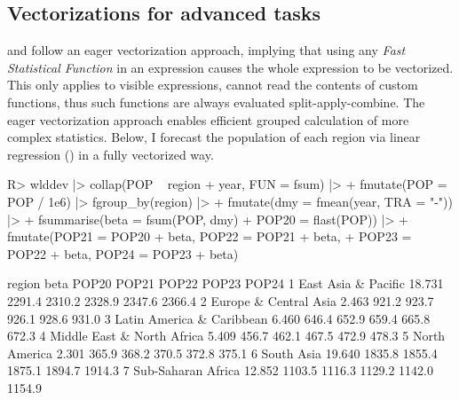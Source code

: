 \documentclass[nojss]{jss} %
\newcommand{\fct}[1]{\code{#1()}}
\begin{document}
\subsection{Vectorizations for advanced tasks} \label{ssec:vfat}
%
\fct{fsummarise} and \fct{fmutate} follow an eager vectorization approach, implying that using any \emph{Fast Statistical Function} in an expression causes the whole expression to be vectorized. This only applies to visible expressions,  cannot read the contents of custom functions, thus such functions are always evaluated split-apply-combine. The eager vectorization approach enables efficient grouped calculation of more complex statistics. Below, I forecast the population of each region via linear regression () in a fully vectorized way.
%
\begin{Schunk}
\begin{Sinput}
R> wlddev |> collap(POP ~ region + year, FUN = fsum) |>
+    fmutate(POP = POP / 1e6) |> fgroup_by(region) |>
+    fmutate(dmy = fmean(year, TRA = "-")) |>
+    fsummarise(beta = fsum(POP, dmy) %/=% fsum(dmy, dmy),
+               POP20 = flast(POP)) |>
+    fmutate(POP21 = POP20 + beta, POP22 = POP21 + beta,
+            POP23 = POP22 + beta, POP24 = POP23 + beta)
\end{Sinput}
\begin{Soutput}
                      region   beta  POP20  POP21  POP22  POP23  POP24
1        East Asia & Pacific 18.731 2291.4 2310.2 2328.9 2347.6 2366.4
2      Europe & Central Asia  2.463  921.2  923.7  926.1  928.6  931.0
3  Latin America & Caribbean  6.460  646.4  652.9  659.4  665.8  672.3
4 Middle East & North Africa  5.409  456.7  462.1  467.5  472.9  478.3
5              North America  2.301  365.9  368.2  370.5  372.8  375.1
6                 South Asia 19.640 1835.8 1855.4 1875.1 1894.7 1914.3
7         Sub-Saharan Africa 12.852 1103.5 1116.3 1129.2 1142.0 1154.9
\end{Soutput}
\end{Schunk}
%
\end{document}
